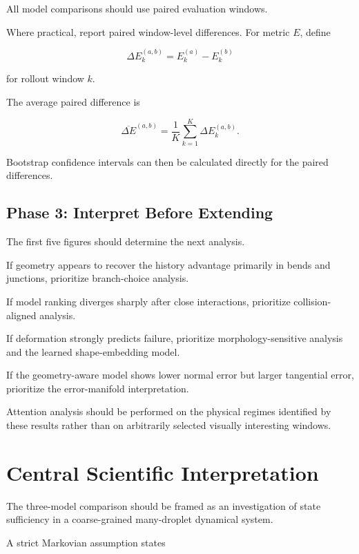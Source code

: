 \documentclass[11pt]{article}
\begin{document}
All model comparisons should use paired evaluation windows.

Where practical, report paired window-level differences. For metric \(E\), define

\begin{equation}
\Delta E_k^{(a,b)}
=
E_k^{(a)}
-
E_k^{(b)}
\end{equation}

for rollout window \(k\).

The average paired difference is

\begin{equation}
\overline{\Delta E}^{(a,b)}
=
\frac{1}{K}
\sum_{k=1}^{K}
\Delta E_k^{(a,b)}.
\end{equation}

Bootstrap confidence intervals can then be calculated directly for the paired differences.

\subsection*{Phase 3: Interpret Before Extending}

The first five figures should determine the next analysis.

If geometry appears to recover the history advantage primarily in bends and junctions, prioritize branch-choice analysis.

If model ranking diverges sharply after close interactions, prioritize collision-aligned analysis.

If deformation strongly predicts failure, prioritize morphology-sensitive analysis and the learned shape-embedding model.

If the geometry-aware model shows lower normal error but larger tangential error, prioritize the error-manifold interpretation.

Attention analysis should be performed on the physical regimes identified by these results rather than on arbitrarily selected visually interesting windows.

\section{Central Scientific Interpretation}

The three-model comparison should be framed as an investigation of state sufficiency in a coarse-grained many-droplet dynamical system.

A strict Markovian assumption states
\end{document}

